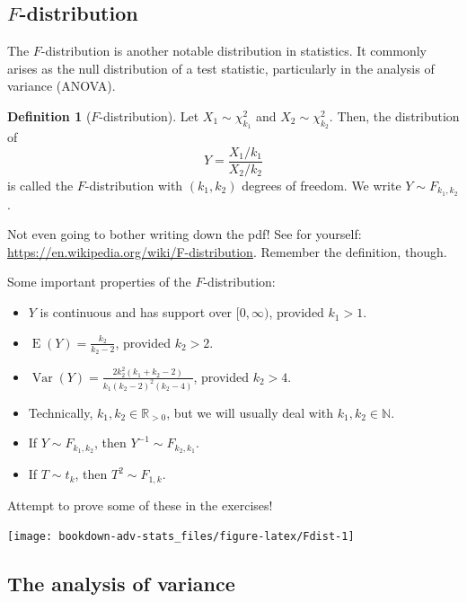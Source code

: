 \documentclass[
]{book}
\providecommand{\tightlist}{%
  \setlength{\itemsep}{0pt}\setlength{\parskip}{0pt}}
\DeclareMathOperator{\E}{E}
\DeclareMathOperator{\Var}{Var}
\newcommand{\bbR}{\mathbb{R}}
\newcommand{\bbN}{\mathbb{N}}
\theoremstyle{definition}
\newtheorem{definition}{Definition}[chapter]
\theoremstyle{definition}
\theoremstyle{definition}
\theoremstyle{definition}
\theoremstyle{remark}
\begin{document}
\hypertarget{f-distribution}{%
\subsection{\texorpdfstring{\(F\)-distribution}{F-distribution}}\label{f-distribution}}

The \(F\)-distribution is another notable distribution in
statistics. It commonly arises as the null distribution of a test
statistic, particularly in the analysis of variance (ANOVA).

\begin{definition}[\(F\)-distribution]
Let \(X_1 \sim \chi^2_{k_1}\) and \(X_2 \sim \chi^2_{k_2}\).
Then, the distribution of \[Y = \frac{X_1/k_1}{X_2/k_2}\] is called the \(F\)-distribution with \((k_1,k_2)\) degrees of freedom.
We write \(Y\sim F_{k_1,k_2}\).
\end{definition}

Not even going to bother writing down the pdf! See for yourself:
\url{https://en.wikipedia.org/wiki/F-distribution}.
Remember the definition, though.

Some important properties of the \(F\)-distribution:

\begin{itemize}
\tightlist
\item
  \(Y\) is continuous and has support over \([0,\infty)\), provided
  \(k_1>1\).
\item
  \(\E(Y)=\frac{k_2}{k_2 - 2}\), provided \(k_2>2\).
\item
  \(\Var(Y) = \frac{2k_2^2(k_1+k_2-2)}{k_1(k_2-2)^2(k_2-4)}\), provided
  \(k_2>4\).
\item
  Technically, \(k_1,k_2\in\bbR_{>0}\), but we will usually deal with
  \(k_1,k_2\in\bbN\).
\item
  If \(Y\sim F_{k_1,k_2}\), then \(Y^{-1}\sim F_{k_2,k_1}\).
\item
  If \(T\sim t_{k}\), then \(T^2 \sim F_{1,k}\).
\end{itemize}

Attempt to prove some of these in the exercises!

\begin{center}\texttt{[image: bookdown-adv-stats\_files/figure-latex/Fdist-1]} \end{center}

\hypertarget{the-analysis-of-variance}{%
\subsection{The analysis of variance}\label{the-analysis-of-variance}}
\end{document}
